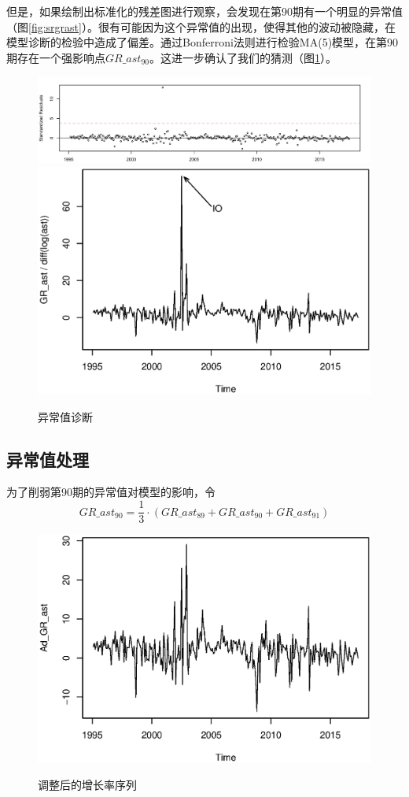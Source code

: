\documentclass[10.5pt,onecolumn,a4paper]{article}%
\begin{document}
但是，如果绘制出标准化的残差图进行观察，会发现在第90期有一个明显的异常值（图\ref{fig:srgrast}）。很有可能因为这个异常值的出现，使得其他的波动被隐藏，在模型诊断的检验中造成了偏差。通过Bonferroni法则进行检验MA(5)模型，在第90期存在一个强影响点$GR\_ast_{90}$。这进一步确认了我们的猜测（图\ref{fig:io}）。
\begin{figure}
    \caption{异常值诊断}
	\centering
	\includegraphics[width=0.8\linewidth]{pic/srgr_ast}
	\label{fig:srgrast}
	\includegraphics[width=0.5\linewidth]{pic/io}
	\label{fig:io}
\end{figure}


\subsection{异常值处理}
为了削弱第90期的异常值对模型的影响，令
$$GR\_ast_{90} = \frac{1}{3} \cdot (GR\_ast_{89}+GR\_ast_{90}+GR\_ast_{91})$$

\begin{figure}
    \caption{调整后的增长率序列}
	\centering
	\includegraphics[width=0.5\linewidth]{pic/adgrast}
	\label{fig:adgrast}
\end{figure}
\end{document}
